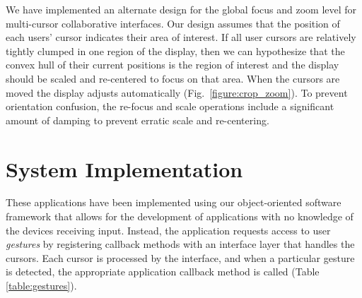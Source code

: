 \documentclass[runningheads,a4paper]{llncs}
\begin{document}
We have implemented an alternate design for the global focus and zoom
level for multi-cursor collaborative interfaces.  Our design 
assumes
that the position of each users' cursor indicates their area of
interest.  If all user cursors are relatively tightly clumped in one
region of the display, then we can hypothesize that the convex hull of
their current positions is the region of interest and the display
should be scaled and re-centered to focus on that area.  When the
cursors are moved the display adjusts automatically
(Fig.~\ref{figure:crop_zoom}).  
To prevent orientation confusion, the
re-focus and scale operations include a significant amount of damping
to prevent erratic scale and re-centering.


\section{System Implementation}

These applications have been implemented using our object-oriented
software framework that allows for the development of applications
with no knowledge of the 
devices receiving 
input. 
Instead, the application requests access to user {\em gestures}
by registering callback methods with an interface layer that handles
the cursors.  Each cursor 
is processed by the interface, and when a
particular gesture is detected, the appropriate application callback
method is called (Table \ref{table:gestures}).


\end{document}
